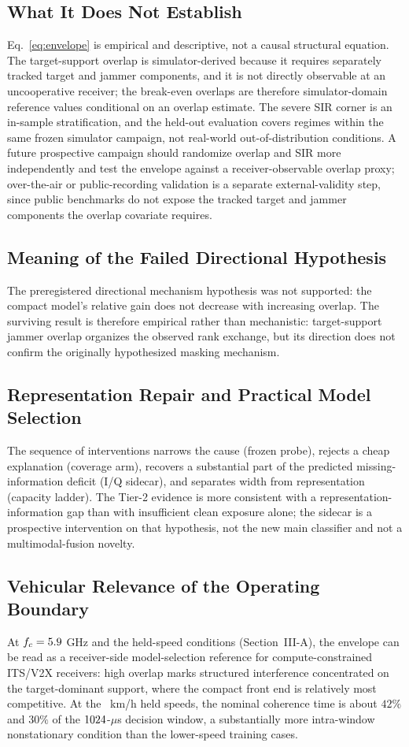 \documentclass[letterpaper,journal]{IEEEtran}
\begin{document}
\subsection{What It Does Not Establish}
Eq.~\eqref{eq:envelope} is empirical and descriptive, not a causal structural
equation. The target-support overlap is simulator-derived because it requires
separately tracked target and jammer components, and it is not directly
observable at an uncooperative receiver; the break-even overlaps are
therefore simulator-domain reference values conditional on an overlap
estimate. The severe SIR corner is an in-sample stratification, and the
held-out evaluation covers regimes within the same frozen simulator campaign,
not real-world out-of-distribution conditions. A future prospective campaign
should randomize overlap and SIR more independently and test the envelope
against a receiver-observable overlap proxy; over-the-air or public-recording
validation \cite{oshea2018ota} is a separate external-validity step, since
public benchmarks do not expose the tracked target and jammer components the
overlap covariate requires.

\subsection{Meaning of the Failed Directional Hypothesis}
The preregistered directional mechanism hypothesis was not supported: the
compact model's relative gain does not decrease with increasing overlap. The
surviving result is therefore empirical rather than mechanistic:
target-support jammer overlap organizes the observed rank exchange, but its
direction does not confirm the originally hypothesized masking mechanism.

\subsection{Representation Repair and Practical Model Selection}
The sequence of interventions narrows the cause (frozen probe), rejects a
cheap explanation (coverage arm), recovers a substantial part of the
predicted missing-information deficit (I/Q sidecar), and separates width
from representation (capacity ladder). The Tier-2 evidence is more
consistent with a representation-information gap than with insufficient
clean exposure alone; the sidecar is a prospective intervention on that
hypothesis, not the new main classifier and not a multimodal-fusion novelty.

\subsection{Vehicular Relevance of the Operating Boundary}
At $f_c=5.9$ GHz and the held-speed conditions (Section~III-A), the
envelope can be read as a receiver-side model-selection reference for
compute-constrained ITS/V2X receivers: high overlap marks structured
interference concentrated on the target-dominant support, where the compact
front end is relatively most competitive. At the \HeldSpeeds\ km/h held speeds, the nominal coherence time is about
$42\%$ and $30\%$ of the $1024$-$\mu$s decision window, a
substantially more intra-window nonstationary condition than the lower-speed
training cases.
\end{document}
